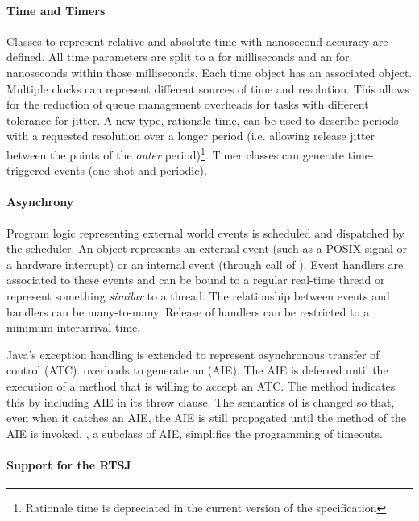 \paragraph{Time and Timers}

Classes to represent relative and absolute time with nanosecond
accuracy are defined. All time parameters are split to a 
for milliseconds and an  for nanoseconds within those
milliseconds. Each time object has an associated 
object. Multiple clocks can represent different sources of time and
resolution. This allows for the reduction of queue management
overheads for tasks with different tolerance for jitter. A new type,
rationale time, can be used to describe periods with a requested
resolution over a longer period (i.e. allowing release jitter
between the points of the \textit{outer} period)\footnote{Rationale
time is depreciated in the current version of the specification}.
Timer classes can generate time-triggered events (one shot and
periodic).

\paragraph{Asynchrony}

Program logic representing external world events is scheduled and
dispatched by the scheduler. An  object represents
an external event (such as a POSIX signal or a hardware interrupt)
or an internal event (through call of ). Event handlers
are associated to these events and can be bound to a regular
real-time thread or represent something \textit{similar} to a
thread. The relationship between events and handlers can be
many-to-many. Release of handlers can be restricted to a minimum
interarrival time.


Java's exception handling is extended to represent asynchronous
transfer of control (ATC).  overloads
 to generate an
 (AIE). The AIE is deferred
until the execution of a method that is willing to accept an ATC.
The method indicates this by including AIE in its throw clause. The
semantics of  is changed so that, even when it catches
an AIE, the AIE is still propagated until the 
method of the AIE is invoked. , a subclass of AIE,
simplifies the programming of timeouts.

\paragraph{Support for the RTSJ}

